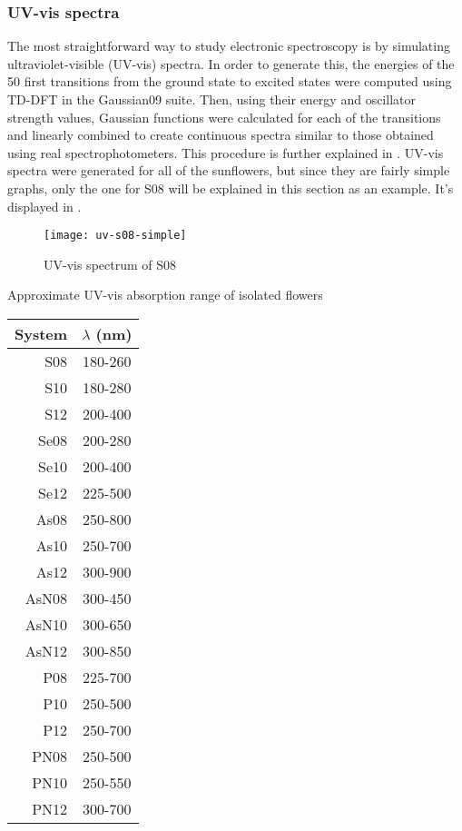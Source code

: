 \subsubsection{UV-vis spectra}
The most straightforward way to study electronic spectroscopy is by simulating ultraviolet-visible (UV-vis) spectra.
In order to generate this, the energies of the 50 first transitions from the ground state to excited states were computed using TD-DFT in the Gaussian09 suite.
Then, using their energy and oscillator strength values, Gaussian functions were calculated for each of the transitions and linearly combined to create continuous spectra similar to those obtained using real spectrophotometers.
This procedure is further explained in .
UV-vis spectra were generated for all of the sunflowers, but since they are fairly simple graphs, only the one for S08 will be explained in this section as an example.
It's displayed in .

\begin{figure}[h]
    \texttt{[image: uv-s08-simple]}
    \caption[UV-vis spectrum of S08]{UV-vis spectrum of S08}
\end{figure}

\begin{margintable}
    \centering
    \caption[UV-vis absorption range of isolated flowers]{Approximate UV-vis absorption range of isolated flowers}
    \begin{tabular}{@{}rc@{}}
        \toprule
        System & $\lambda$ (\si{\nano\metre}) \\
        \midrule
        S08 & 180-260 \\
        S10 & 180-280 \\
        S12 & 200-400 \\
        Se08 & 200-280 \\
        Se10 & 200-400 \\
        Se12 & 225-500 \\
        As08 & 250-800 \\
        As10 & 250-700 \\
        As12 & 300-900 \\
        AsN08 & 300-450 \\
        AsN10 & 300-650 \\
        AsN12 & 300-850 \\
        P08 & 225-700 \\
        P10 & 250-500 \\
        P12 & 250-700 \\
        PN08 & 250-500 \\
        PN10 & 250-550 \\
        PN12 & 300-700 \\
    \end{tabular}
\end{margintable}

